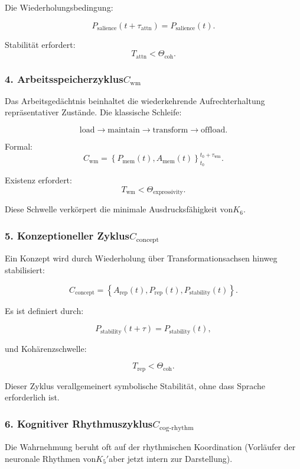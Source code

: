 Die Wiederholungsbedingung:

\[
  P_{\mathrm{salience}}(t+\tau_{\mathrm{attn}}) = P_{\mathrm{salience}}(t).
\]

Stabilität erfordert:
\[
  T_{\mathrm{attn}} < \Theta_{\mathrm{coh}}.
\]

\subsubsection{4. Arbeitsspeicherzyklus$C_{\mathrm{wm}}$}

Das Arbeitsgedächtnis beinhaltet die wiederkehrende Aufrechterhaltung repräsentativer Zustände.
Die klassische Schleife:

\[
 \mathrm{load}
 \to
 \mathrm{maintain}
 \to
 \mathrm{transform}
 \to
 \mathrm{offload}.
\]

Formal:
\[
 C_{\mathrm{wm}} =
 \left\{
   P_{\mathrm{mem}}(t), A_{\mathrm{mem}}(t)
 \right\}_{t_0}^{t_0+\tau_{\mathrm{wm}}}.
\]

Existenz erfordert:
\[
 T_{\mathrm{wm}} < \Theta_{\mathrm{expressivity}}.
\]

Diese Schwelle verkörpert die minimale Ausdrucksfähigkeit von$K_6$.

\subsubsection{5. Konzeptioneller Zyklus$C_{\mathrm{concept}}$}

Ein Konzept wird durch Wiederholung über Transformationsachsen hinweg stabilisiert:

\[
  C_{\mathrm{concept}}
    = \left\{
      A_{\mathrm{rep}}(t),
      P_{\mathrm{rep}}(t),
      P_{\mathrm{stability}}(t)
    \right\}.
\]

Es ist definiert durch:

\[
  P_{\mathrm{stability}}(t+\tau) = P_{\mathrm{stability}}(t),
\]

und Kohärenzschwelle:

\[
  T_{\mathrm{rep}} < \Theta_{\mathrm{coh}}.
\]

Dieser Zyklus verallgemeinert symbolische Stabilität, ohne dass Sprache erforderlich ist.

\subsubsection{6. Kognitiver Rhythmuszyklus$C_{\mathrm{cog\text{-}rhythm}}$}

Die Wahrnehmung beruht oft auf der rhythmischen Koordination (Vorläufer der
neuronale Rhythmen von$K_5'$aber jetzt intern zur Darstellung).

